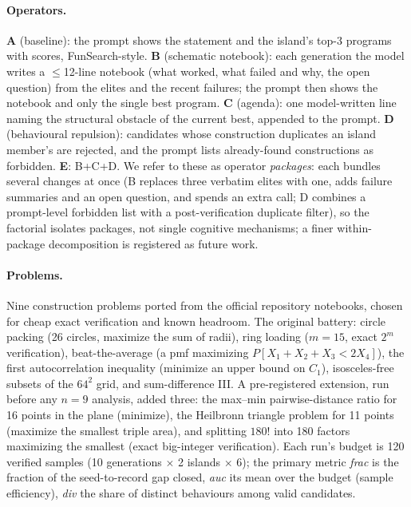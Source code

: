 \documentclass[11pt]{article}
\begin{document}
\paragraph{Operators.} \textbf{A} (baseline): the prompt shows the
statement and the island's top-3 programs with scores, FunSearch-style.
\textbf{B} (schematic notebook): each generation the model writes a
$\le$12-line notebook (what worked, what failed and why, the open
question) from the elites and the recent failures; the prompt then
shows the notebook and only the single best program. \textbf{C} (agenda):
one model-written line naming the structural obstacle of the current best,
appended to the prompt. \textbf{D} (behavioural repulsion): candidates
whose construction duplicates an island member's are rejected, and the
prompt lists already-found constructions as forbidden. \textbf{E}: B+C+D. We refer to these as operator \emph{packages}: each
bundles several changes at once (B replaces three verbatim elites with
one, adds failure summaries and an open question, and spends an extra
call; D combines a prompt-level forbidden list with a post-verification
duplicate filter), so the factorial isolates packages, not single
cognitive mechanisms; a finer within-package decomposition is registered
as future work.

\paragraph{Problems.} Nine construction problems ported from the official
repository notebooks, chosen for cheap exact verification and known
headroom. The original battery: circle packing (26 circles, maximize the
sum of radii), ring loading ($m{=}15$, exact $2^m$ verification),
beat-the-average (a pmf maximizing $P[X_1{+}X_2{+}X_3<2X_4]$), the first
autocorrelation inequality (minimize an upper bound on $C_1$),
isosceles-free subsets of the $64^2$ grid, and sum-difference III. A
pre-registered extension, run before any $n{=}9$ analysis, added three:
the max--min pairwise-distance ratio for 16 points in the plane
(minimize), the Heilbronn triangle problem for 11 points (maximize the
smallest triple area), and splitting $180!$ into 180 factors maximizing
the smallest (exact big-integer verification). Each run's budget is 120 verified
samples (10 generations $\times$ 2 islands $\times$ 6); the primary
metric \emph{frac} is the fraction of the seed-to-record gap closed,
\emph{auc} its mean over the budget (sample efficiency), \emph{div} the
share of distinct behaviours among valid candidates.
\end{document}
